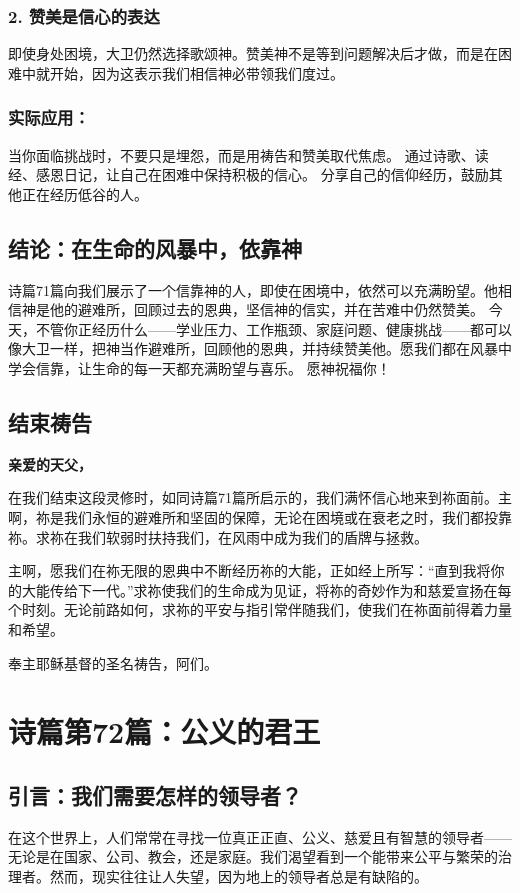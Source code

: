 \documentclass[a4paper, 12pt]{article}
\begin{document}
\subsubsection*{2. 赞美是信心的表达}
即使身处困境，大卫仍然选择歌颂神。赞美神不是等到问题解决后才做，而是在困难中就开始，因为这表示我们相信神必带领我们度过。
\subsubsection*{实际应用：}
当你面临挑战时，不要只是埋怨，而是用祷告和赞美取代焦虑。
通过诗歌、读经、感恩日记，让自己在困难中保持积极的信心。
分享自己的信仰经历，鼓励其他正在经历低谷的人。
\subsection*{结论：在生命的风暴中，依靠神}
诗篇71篇向我们展示了一个信靠神的人，即使在困境中，依然可以充满盼望。他相信神是他的避难所，回顾过去的恩典，坚信神的信实，并在苦难中仍然赞美。
今天，不管你正经历什么——学业压力、工作瓶颈、家庭问题、健康挑战——都可以像大卫一样，把神当作避难所，回顾他的恩典，并持续赞美他。愿我们都在风暴中学会信靠，让生命的每一天都充满盼望与喜乐。
愿神祝福你！
\subsection*{结束祷告}
\textbf{亲爱的天父，}

在我们结束这段灵修时，如同诗篇71篇所启示的，我们满怀信心地来到祢面前。主啊，祢是我们永恒的避难所和坚固的保障，无论在困境或在衰老之时，我们都投靠祢。求祢在我们软弱时扶持我们，在风雨中成为我们的盾牌与拯救。

主啊，愿我们在祢无限的恩典中不断经历祢的大能，正如经上所写：“直到我将你的大能传给下一代。”求祢使我们的生命成为见证，将祢的奇妙作为和慈爱宣扬在每个时刻。无论前路如何，求祢的平安与指引常伴随我们，使我们在祢面前得着力量和希望。

奉主耶稣基督的圣名祷告，阿们。
\newpage
\section{诗篇第72篇：公义的君王}
\subsection*{引言：我们需要怎样的领导者？}
\hspace{0.6cm}在这个世界上，人们常常在寻找一位真正正直、公义、慈爱且有智慧的领导者——无论是在国家、公司、教会，还是家庭。我们渴望看到一个能带来公平与繁荣的治理者。然而，现实往往让人失望，因为地上的领导者总是有缺陷的。
\end{document}
